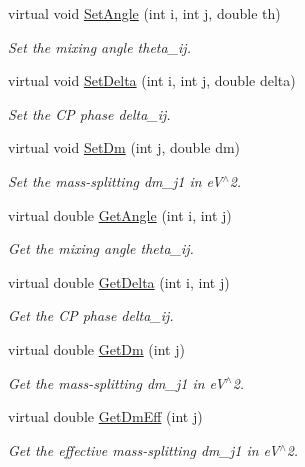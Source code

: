 \begin{DoxyCompactItemize}
virtual void \hyperlink{classOscProb_1_1PMNS__Base_ace7875cf6d3bec161a2b7ed2690aec34}{Set\+Angle} (int i, int j, double th)
\begin{DoxyCompactList}\small\item\em Set the mixing angle theta\+\_\+ij. \end{DoxyCompactList}\item 
virtual void \hyperlink{classOscProb_1_1PMNS__Base_a4bef78cfcfc4e70b4ce79cdb8862c0a3}{Set\+Delta} (int i, int j, double delta)
\begin{DoxyCompactList}\small\item\em Set the CP phase delta\+\_\+ij. \end{DoxyCompactList}\item 
virtual void \hyperlink{classOscProb_1_1PMNS__Base_a492243b22fb1b783cd2943f507cff970}{Set\+Dm} (int j, double dm)
\begin{DoxyCompactList}\small\item\em Set the mass-\/splitting dm\+\_\+j1 in e\+V$^\wedge$2. \end{DoxyCompactList}\item 
virtual double \hyperlink{classOscProb_1_1PMNS__Base_acee137091304c919642293ddf015bbc8}{Get\+Angle} (int i, int j)
\begin{DoxyCompactList}\small\item\em Get the mixing angle theta\+\_\+ij. \end{DoxyCompactList}\item 
virtual double \hyperlink{classOscProb_1_1PMNS__Base_adb8dbc91d4286d2e7c8f768c59476241}{Get\+Delta} (int i, int j)
\begin{DoxyCompactList}\small\item\em Get the CP phase delta\+\_\+ij. \end{DoxyCompactList}\item 
virtual double \hyperlink{classOscProb_1_1PMNS__Base_ad26815ac5f4805d1259817e4936e5f8f}{Get\+Dm} (int j)
\begin{DoxyCompactList}\small\item\em Get the mass-\/splitting dm\+\_\+j1 in e\+V$^\wedge$2. \end{DoxyCompactList}\item 
virtual double \hyperlink{classOscProb_1_1PMNS__Base_a4ea861a6707ce1be3a54aad2b60f8632}{Get\+Dm\+Eff} (int j)
\begin{DoxyCompactList}\small\item\em Get the effective mass-\/splitting dm\+\_\+j1 in e\+V$^\wedge$2. \end{DoxyCompactList}\item 

\end{DoxyCompactItemize}
